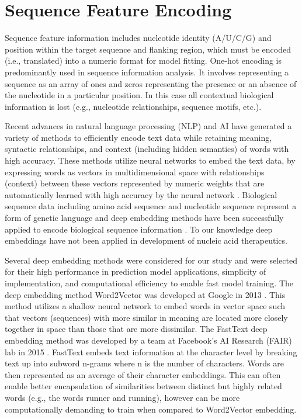\documentclass{report}
\begin{document}
\section{Sequence Feature Encoding}\label{met:sequence feature encoding}
Sequence feature information includes nucleotide identity (A/U/C/G) and position within the target sequence and flanking region, which must be encoded (i.e., translated) into a numeric format for model fitting. One-hot encoding is predominantly used in sequence information analysis. It involves representing a sequence as an array of ones and zeros representing the presence or an absence of the nucleotide in a particular position. In this case all contextual biological information is lost (e.g., nucleotide relationships, sequence motifs, etc.). 

Recent advances in natural language processing (NLP) and AI have generated a variety of methods to efficiently encode text data while retaining meaning, syntactic relationships, and context (including hidden semantics) of words with high accuracy. These methods utilize neural networks to embed the text data, by expressing words as vectors in multidimensional space with relationships (context) between these vectors represented by numeric weights that are automatically learned with high accuracy by the neural network \cite{rosenblatt_perceptron_1958}. Biological sequence data including amino acid sequence and nucleotide sequence represent a form of genetic language and deep embedding methods have been successfully applied to encode biological sequence information \cite{littmann_protein_2021, mahmud_deep-wet_2024}. To our knowledge deep embeddings have not been applied in development of nucleic acid therapeutics. 

Several deep embedding methods were considered for our study and were selected for their high performance in prediction model applications, simplicity of implementation, and computational efficiency to enable fast model training. The deep embedding method Word2Vector was developed at Google in 2013 \cite{mikolov_distributed_2013}. This method utilizes a shallow neural network to embed words in vector space such that vectors (sequences) with more similar in meaning are located more closely together in space than those that are more dissimilar. The FastText deep embedding method was developed by a team at Facebook's AI Research (FAIR) lab in 2015 \cite{bojanowski_enriching_2017}. FastText embeds text information at the character level by breaking text up into subword n-grams where n is the number of characters. Words are then represented as an average of their character embeddings. This can often enable better encapsulation of similarities between distinct but highly related words (e.g., the words runner and running), however can be more computationally demanding to train when compared to Word2Vector embedding.
\end{document}
